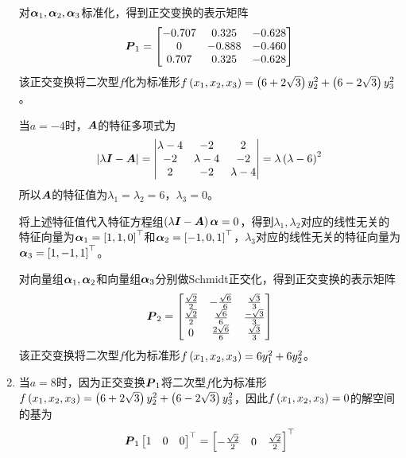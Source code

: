 \documentclass{beamer}
\begin{document}
\begin{frame}[allowframebreaks]
\begin{enumerate}
{              对\(\boldsymbol{\alpha}_1,\boldsymbol{\alpha}_2,\boldsymbol{\alpha}_3\)标准化，得到正交变换的表示矩阵
              \begin{equation*}
                  \boldsymbol{P}_1=
                  \begin{bmatrix}
                      -0.707 & 0.325  & -0.628 \\
                      0      & -0.888 & -0.460 \\
                      0.707  & 0.325  & -0.628
                  \end{bmatrix}
              \end{equation*}
              该正交变换将二次型\(f\)化为标准形\(f\left( x_1,x_2,x_3 \right)=\left( 6+2\sqrt{3} \right)y_2^2+\left( 6-2\sqrt{3} \right)y_3^2\)。

              当\(a=-4\)时，\(\boldsymbol{A}\)的特征多项式为
              \begin{equation*}
                  \left|\lambda\boldsymbol{I}-\boldsymbol{A} \right|=\begin{vmatrix}\lambda-4&-2&2\\-2&\lambda-4&-2\\2&-2&\lambda-4\end{vmatrix}=\lambda\left( \lambda-6 \right)^2
              \end{equation*}
              所以\(\boldsymbol{A}\)的特征值为\(\lambda_1=\lambda_2=6\)，\(\lambda_3=0\)。

              将上述特征值代入特征方程组\(\left( \lambda\boldsymbol{I}-\boldsymbol{A} \right)\boldsymbol{\alpha}=0\)，得到\(\lambda_1,\lambda_2\)对应的线性无关的特征向量为\(\boldsymbol{\alpha}_1=\left[ 1,1,0 \right]^\top\)和\(\boldsymbol{\alpha}_2=\left[ -1,0,1 \right]^\top\)，\(\lambda_3\)对应的线性无关的特征向量为\(\boldsymbol{\alpha}_3=\left[ 1,-1,1 \right]^\top\)。

              对向量组\(\boldsymbol{\alpha}_1,\boldsymbol{\alpha}_2\)和向量组\(\boldsymbol{\alpha}_3\)分别做Schmidt正交化，得到正交变换的表示矩阵
              \begin{equation*}
                  \boldsymbol{P}_2=
                  \begin{bmatrix}
                      \frac{\sqrt{2}}{2} & -\frac{\sqrt{6}}{6} & \frac{\sqrt{3}}{3}  \\
                      \frac{\sqrt{2}}{2} & \frac{\sqrt{6}}{6}  & \frac{-\sqrt{3}}{3} \\
                      0                  & \frac{2\sqrt{6}}{6} & \frac{\sqrt{3}}{3}
                  \end{bmatrix}
              \end{equation*}
              该正交变换将二次型\(f\)化为标准形\(f\left( x_1,x_2,x_3 \right)=6y_1^2+6y_2^2\)。
              }
        \item {
              当\(a=8\)时，因为正交变换\(\boldsymbol{P}_1\)将二次型\(f\)化为标准形\(f\left( x_1,x_2,x_3 \right)=\left( 6+2\sqrt{3} \right)y_2^2+\left( 6-2\sqrt{3} \right)y_3^2\)，因此\(f\left( x_1,x_2,x_3 \right)=0\)的解空间的基为
              \begin{equation*}
                  \boldsymbol{P}_1\begin{bmatrix}1&0&0\end{bmatrix}^\top=\begin{bmatrix}-\frac{\sqrt{2}}{2}&0&\frac{\sqrt{2}}{2}\end{bmatrix}^\top
              \end{equation*}

}
\end{enumerate}
\end{frame}
\end{document}
